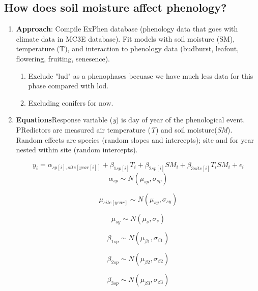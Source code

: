 \documentclass{article}
\begin{document}
\begin{singlespace}
\section{How does soil moisture affect phenology?}
\begin{enumerate}
\item{\textbf{Approach}: Compile ExPhen database (phenology data that goes with climate data in MC3E database). Fit models with soil moisture (SM), temperature (T), and interaction to phenology data (budburst, leafout, flowering, fruiting, senesence). }
\begin{enumerate}
\item{Exclude "lud" as a phenophases becuase we have much less data for this phase compared with lod.}
\item{Excluding conifers for now.}
\end{enumerate}
\item{\textbf{Equations}Response variable (\textit{y}) is day of year of the phenological event. PRedictors are measured air temperature (\textit{T}) and soil moisture(\textit{SM}). Random effects are species (random slopes and intercepts); site and for year nested within site (random intercepts).}

\begin{equation}
y_{i}=\alpha_{sp[i],site[year[i]]}+ \beta_{1 sp[i]}T_i+\beta_{2 sp[i]}SM_i+\beta_{3 site[i]}T_iSM_i+\epsilon_{i}
\end{equation}
\begin{equation}
\alpha_{sp}\sim N(\mu_{sp}, \sigma_{sp})
\end{equation}

\begin{equation}
\mu_{site[year]} \sim N(\mu_{sy}, \sigma_{sy})
\end{equation}

\begin{equation}
\mu_{sy} \sim N(\mu_{s}, \sigma_{s})
\end{equation}

\begin{equation}
\beta_{1 sp} \sim N(\mu_{\beta1}, \sigma_{\beta1})
\end{equation}

\begin{equation}
\beta_{2 sp} \sim N(\mu_{\beta2}, \sigma_{\beta2})
\end{equation}

\begin{equation}
\beta_{3 sp} \sim N(\mu_{\beta3}, \sigma_{\beta3})
\end{equation}


\end{enumerate}
\end{singlespace}
\end{document}
